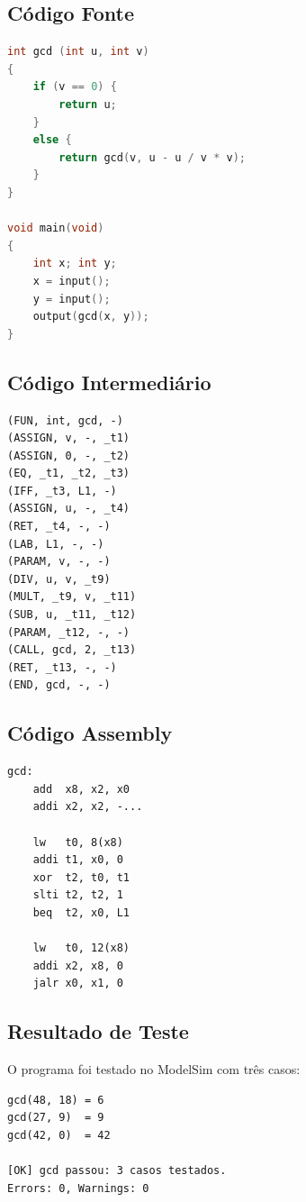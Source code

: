 \documentclass[12pt,a4paper]{report}
\begin{document}
\subsection{Código Fonte}

\begin{lstlisting}[language=C]
int gcd (int u, int v)
{
    if (v == 0) {
        return u;
    }
    else {
        return gcd(v, u - u / v * v);
    }
}

void main(void)
{
    int x; int y;
    x = input();
    y = input();
    output(gcd(x, y));
}
\end{lstlisting}

\subsection{Código Intermediário}

\begin{lstlisting}
(FUN, int, gcd, -)
(ASSIGN, v, -, _t1)
(ASSIGN, 0, -, _t2)
(EQ, _t1, _t2, _t3)
(IFF, _t3, L1, -)
(ASSIGN, u, -, _t4)
(RET, _t4, -, -)
(LAB, L1, -, -)
(PARAM, v, -, -)
(DIV, u, v, _t9)
(MULT, _t9, v, _t11)
(SUB, u, _t11, _t12)
(PARAM, _t12, -, -)
(CALL, gcd, 2, _t13)
(RET, _t13, -, -)
(END, gcd, -, -)
\end{lstlisting}

\subsection{Código Assembly}

\begin{lstlisting}
gcd:
    add  x8, x2, x0
    addi x2, x2, -...

    lw   t0, 8(x8)
    addi t1, x0, 0
    xor  t2, t0, t1
    slti t2, t2, 1
    beq  t2, x0, L1

    lw   t0, 12(x8)
    addi x2, x8, 0
    jalr x0, x1, 0
\end{lstlisting}

\subsection{Resultado de Teste}

O programa foi testado no ModelSim com três casos:

\begin{lstlisting}
gcd(48, 18) = 6
gcd(27, 9)  = 9
gcd(42, 0)  = 42

[OK] gcd passou: 3 casos testados.
Errors: 0, Warnings: 0
\end{lstlisting}
\end{document}
